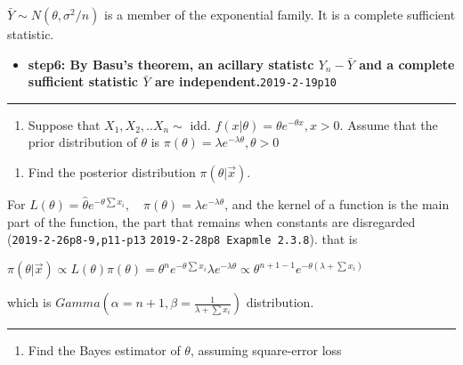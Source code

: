 \documentclass[12pt,]{article}
\providecommand{\tightlist}{%
  \setlength{\itemsep}{0pt}\setlength{\parskip}{0pt}}
\begin{document}
\(\bar Y\sim N(\theta,\sigma^2/n)\) is a member of the exponential
family. It is a complete sufficient statistic.

\begin{itemize}
\tightlist
\item
  \textbf{step6: By Basu's theorem, an acillary statistc \(Y_n-\bar Y\)
  and a complete sufficient statistic \(\bar Y\) are
  independent.}\texttt{2019-2-19p10}
\end{itemize}

\begin{center}\rule{0.5\linewidth}{\linethickness}\end{center}

\begin{enumerate}
\def\labelenumi{\arabic{enumi}.}
\setcounter{enumi}{2}
\tightlist
\item
  \textcolor[rgb]{0.5,0.5,0.5}{Suppose that $X_1,X_2,..X_n\sim$ idd. $f(x|\theta)=\theta e^{-\theta x}, x>0$. Assume that the prior distribution of $\theta$ is $\pi(\theta)=\lambda e^{-\lambda\theta},\theta>0$}
\end{enumerate}

\begin{enumerate}
\def\labelenumi{\alph{enumi}.}
\tightlist
\item
  \textcolor[rgb]{0.5,0.5,0.5}{Find the posterior distribution $\pi(\theta|\vec x)$.}
\end{enumerate}

For
\(L(\theta)=\hat\theta e^{-\theta\sum x_i},\quad \pi(\theta)=\lambda e^{-\lambda\theta}\),
and the kernel of a function is the main part of the function, the part
that remains when constants are disregarded
(\texttt{2019-2-26p8-9,p11-p13} \texttt{2019-2-28p8\ Exapmle\ 2.3.8}).
that is

\(\pi(\theta|\vec x)\propto L(\theta)\pi(\theta)=\theta^n e^{-\theta\sum x_i}\lambda e^{-\lambda\theta}\propto\theta^{n+1-1}e^{-\theta(\lambda+\sum x_i)}\)

which is \(Gamma(\alpha=n+1,\beta=\frac1{\lambda+\sum x_i})\)
distribution.

\begin{center}\rule{0.5\linewidth}{\linethickness}\end{center}

\begin{enumerate}
\def\labelenumi{\alph{enumi}.}
\setcounter{enumi}{1}
\tightlist
\item
  \textcolor[rgb]{0.5,0.5,0.5}{Find the Bayes estimator of $\theta$, assuming square-error loss}
\end{enumerate}
\end{document}

